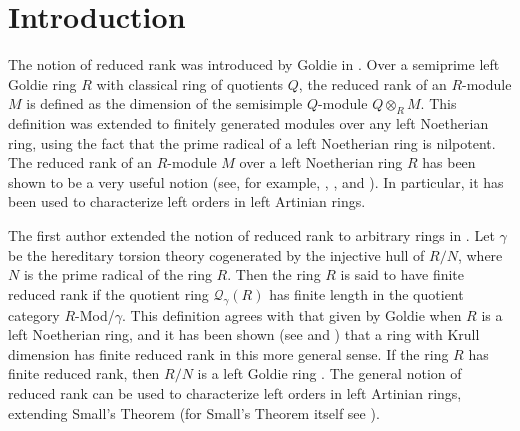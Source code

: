 \documentclass{amsart}
\theoremstyle{definition}
\theoremstyle{remark}
\numberwithin{equation}{section}
\begin{document}
	\maketitle
	
	\section{Introduction}
	
	The notion of reduced rank 
	was introduced by Goldie in \cite{goldie1964torsion}. 
	Over a semiprime left Goldie ring $R$ with classical ring of quotients $Q$, 
	the reduced rank of an $R$-module $M$ is defined 
	as the dimension of the semisimple $Q$-module $Q\otimes_R M$. 
	This definition was extended to finitely generated modules 
	over any left Noetherian ring,
	using the fact that the prime radical of a left Noetherian ring is nilpotent. 
	The reduced rank of an $R$-module $M$ over a left Noetherian ring $R$ 
	has been shown to be a very useful notion 
	(see, for example, \cite{chatters1979reduced}, 
	\cite[Chapter~12]{lamlectures}, and 
	\cite[Chapter~4]{mcconnell2001noncommutative}).  
	In particular, 
	it has been used to characterize left orders in left Artinian rings. 
	
	The first author extended the notion of reduced rank 
	to arbitrary rings in \cite{beachy1982rings}. 
	Let $\gamma$ be the hereditary torsion theory 
	cogenerated by the injective hull of $R/N$, 
	where $N$ is the prime radical of the ring $R$. 
	Then the ring $R$ is said to have finite reduced rank 
	if the quotient ring $\mathcal{Q}_\gamma(R)$ 
	has finite length in the quotient category $R$-Mod/$\gamma$. 
	This definition agrees with that given by Goldie 
	when $R$ is a left Noetherian ring, 
	and it has been shown 
	(see \cite{lenagan} and \cite{beachy1982rings}) 
	that a ring with Krull dimension has finite reduced rank
	in this more general sense. 
	If the ring $R$ has finite reduced rank, 
	then $R/N$ is a left Goldie ring
	\cite[Theorem 1]{beachy1982rings}. 
	The general notion of reduced rank can be used 
	to characterize left orders in left Artinian rings,
	extending Small's Theorem \cite[Theorem 4]{beachy1982rings} 
	(for Small's Theorem itself see \cite[4.1.4]{mcconnell2001noncommutative}). 
	
\end{document}
